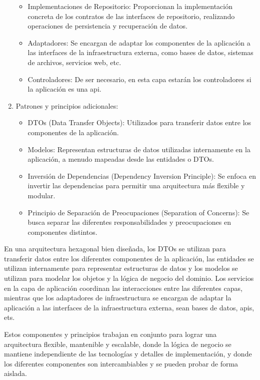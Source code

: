 \documentclass[executivepaper]{article}
\begin{document}
\begin{enumerate}
\begin{itemize}
        \item Implementaciones de Repositorio: Proporcionan la implementación concreta de los contratos de las interfaces de repositorio, realizando operaciones de persistencia y recuperación de datos.
        \item Adaptadores: Se encargan de adaptar los componentes de la aplicación a las interfaces de la infraestructura externa, como bases de datos, sistemas de archivos, servicios web, etc.
        \item Controladores: De ser necesario, en esta capa estarán los controladores si la aplicación es una api.
    \end{itemize}
    \item Patrones y principios adicionales:
   \begin{itemize}
        \item DTOs (Data Transfer Objects): Utilizados para transferir datos entre los componentes de la aplicación.
        \item Modelos: Representan estructuras de datos utilizadas internamente en la aplicación, a menudo mapeadas desde las entidades o DTOs.
        \item Inversión de Dependencias (Dependency Inversion Principle): Se enfoca en invertir las dependencias para permitir una arquitectura más flexible y modular.
        \item Principio de Separación de Preocupaciones (Separation of Concerns): Se busca separar las diferentes responsabilidades y preocupaciones en componentes distintos.
    \end{itemize}
\end{enumerate}

En una arquitectura hexagonal bien diseñada, los DTOs se utilizan para transferir datos entre los diferentes componentes de la aplicación, las entidades se utilizan internamente para representar estructuras de datos y los modelos se utilizan para modelar los objetos y la lógica de negocio del dominio. Los servicios en la capa de aplicación coordinan las interacciones entre las diferentes capas, mientras que los adaptadores de infraestructura se encargan de adaptar la aplicación a las interfaces de la infraestructura externa, sean bases de datos, apis, ets.

Estos componentes y principios trabajan en conjunto para lograr una arquitectura flexible, mantenible y escalable, donde la lógica de negocio se mantiene independiente de las tecnologías y detalles de implementación, y donde los diferentes componentes son intercambiables y se pueden probar de forma aislada.
\end{document}
